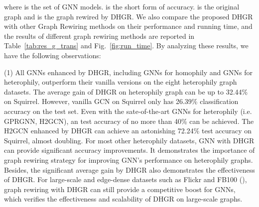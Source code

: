 \documentclass[sigconf]{acmart}
\begin{document}
	where  is the set of GNN models.  is the short form of accuracy.   is the original graph and  is the graph rewired by DHGR.  We also compare the proposed DHGR with other Graph Rewiring methods on their performance and running time, and the results of different graph rewiring methods are reported in Table~\ref{tab:res_g_trans} and Fig.~\ref{fig:run_time}. By analyzing these results,  we have the following observations:
	
	(1) All GNNs enhanced by DHGR, including GNNs for homophily and GNNs for heterophily, outperform their vanilla versions on the eight heterophily graph datasets.  The average gain of DHGR on heterophily graph can be up to 32.44\% on Squirrel. However,  vanilla GCN on Squirrel only has 26.39\% classification accuracy on the test set. Even with the sate-of-the-art GNNs for heterophily (i.e. GPRGNN, H2GCN),  an test accuracy of no more than 40\% can be achieved. The H2GCN enhanced by DHGR can achieve an astonishing 72.24\% test accuracy on Squirrel, almost doubling. For most other heterophily datasets, GNN with DHGR can provide significant accuracy improvements. It demonstrates the importance of graph rewiring strategy for improving GNN's performance on heterophily graphs. Besides, the significant average gain by DHGR also demonstrates the effectiveness of DHGR.  For large-scale and edge-dense datasets such as Flickr and FB100 (), graph rewiring with DHGR can still provide a competitive boost for GNNs, which verifies the effectiveness and scalability of DHGR on large-scale graphs.
	
\end{document}

